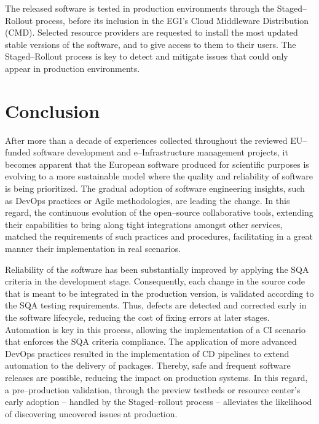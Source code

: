 \documentclass[journal]{IEEEtran}
\begin{document}
The released software is tested in production environments through the
Staged--Rollout process, before its inclusion in the EGI's Cloud Middleware Distribution (CMD).
Selected resource providers are requested to install
the most updated stable versions of the software, and to give access to them to their users. The
Staged--Rollout process is key to detect and mitigate issues that could only
appear in production environments.

\section{Conclusion}
\label{sec:con}

After more than a decade of experiences collected throughout the reviewed
EU--funded software development and e--Infrastructure management projects, it
becomes apparent that the European software produced for scientific purposes is
evolving to a more sustainable model where the quality and reliability of
software is being prioritized. The gradual adoption of software engineering insights, such as
DevOps practices or Agile methodologies, are leading the change. In this regard, the continuous evolution of the open--source
collaborative tools, extending their capabilities to bring along tight
integrations amongst other services, matched the requirements of such practices
and procedures, facilitating in a great manner their implementation in real scenarios.

Reliability of the software has been substantially improved by applying the SQA
criteria in the development stage. Consequently, each change in the source code
that is meant to be integrated in the production version, is validated according
to the SQA testing requirements. Thus, defects are detected and corrected early in the
software lifecycle, reducing the cost of fixing errors at later stages. Automation is
key in this process, allowing the implementation of a CI scenario that enforces
the SQA criteria compliance. The application of more advanced DevOps practices
resulted in the implementation of CD pipelines to extend automation to the
delivery of packages. Thereby, safe and frequent software releases are possible, reducing
the impact on production systems. In this regard, a pre--production validation,
through the preview testbeds or resource center’s early adoption -- handled by the
Staged--rollout process -- alleviates the likelihood of discovering uncovered
issues at production.
\end{document}

